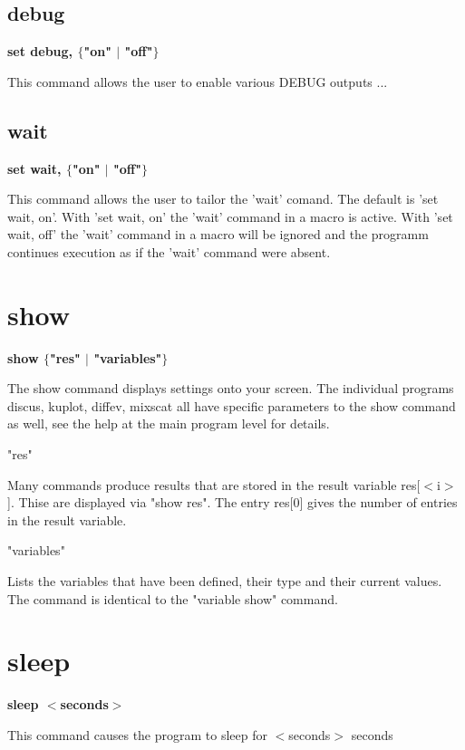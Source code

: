 \subsection*{debug}
{\bf set debug, $ \{$"on" $| $ "off"$\} $ \par }
\par
\vspace{3pt}
This command allows the user to enable various DEBUG outputs ... 
\subsection*{wait}
{\bf set wait, $ \{$"on" $| $ "off"$\} $ \par }
\par
\vspace{3pt}
This command allows the user to tailor the 'wait' comand. 
The default is 'set wait, on'. 
With 'set wait, on' the 'wait' command in a macro is active. 
With 'set wait, off' the 'wait' command in a macro will be 
ignored and the programm continues execution as if the 
'wait' command were absent. 
\section{show}
{\bf show $ \{$"res" $| $ "variables"$\} $ \par }
\par
\vspace{3pt}
The show command displays settings onto your screen. The individual 
programs discus, kuplot, diffev, mixscat all have specific parameters 
to the show command as well, see the help at the main program level 
for details. 
\par
\begin{MacVerbatim}
"res"
\end{MacVerbatim}
Many commands produce results that are stored in the result variable 
res[$ <$i$> $]. Thise are displayed via "show res". 
The entry res[0] gives the number of entries in the result variable. 
\par
\begin{MacVerbatim}
"variables"
\end{MacVerbatim}
Lists the variables that have been defined, their type and their 
current values. The command is identical to the "variable show" 
command. 
\section{sleep}
{\bf sleep $ <$seconds$> $ \par }
\par
\vspace{3pt}
This command causes the program to sleep for $ <$seconds$> $ seconds 

